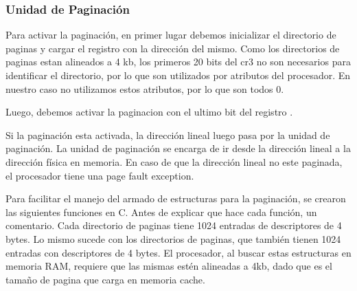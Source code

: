 \subsubsection{Unidad de Paginación}

Para activar la paginación, en primer lugar debemos inicializar el directorio de paginas y cargar el registro  con la dirección del mismo. Como los directorios de paginas estan alineados a 4 kb, los primeros 20 bits del cr3 no son necesarios para identificar el directorio, por lo que son utilizados por atributos del procesador. En nuestro caso no utilizamos estos atributos, por lo que son todos 0.

Luego, debemos activar la paginacion con el ultimo bit del registro .

Si la paginación esta activada, la dirección lineal luego pasa por la unidad de paginación. La unidad de paginación se encarga de ir desde la dirección lineal a la dirección física en memoria. En caso de que la dirección lineal no este paginada, el procesador tiene una page fault exception.

Para facilitar el manejo del armado de estructuras para la paginación, se crearon las siguientes funciones en C. Antes de explicar que hace cada función, un comentario. Cada directorio de paginas tiene 1024 entradas de descriptores de 4 bytes. Lo mismo sucede con los directorios de paginas, que también tienen 1024 entradas con descriptores de 4 bytes. El procesador, al buscar estas estructuras en memoria RAM, requiere que las mismas estén alineadas a 4kb, dado que es el tamaño de pagina que carga en memoria cache.

